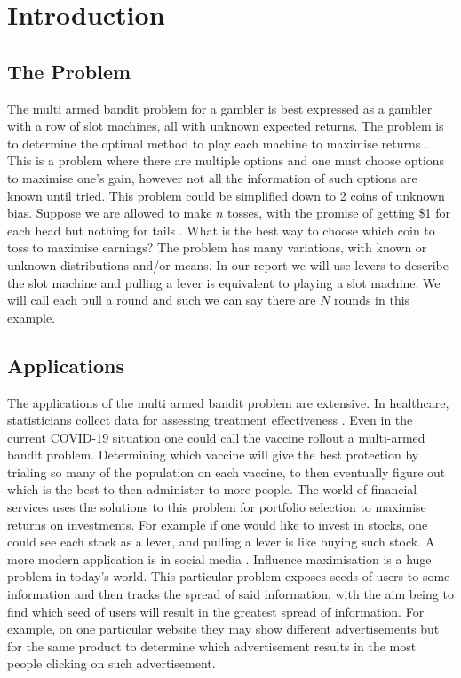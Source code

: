 \section{Introduction}\label{sec:introduction}

\subsection{The Problem}\label{subsec:the-problem}
The multi armed bandit problem for a gambler is best expressed as a gambler with a row of slot machines, all with unknown expected returns.
The problem is to determine the optimal method to play each machine to maximise returns \citep{vermorel}.
This is a problem where there are multiple options and one must choose options to maximise one's gain, however not all the information of such options are known until tried.
\newline
\newline
This problem could be simplified down to 2 coins of unknown bias.
Suppose we are allowed to make $n$ tosses, with the promise of getting \$1 for each head but nothing for tails \citep{robbins1952some}.
What is the best way to choose which coin to toss to maximise earnings?
The problem has many variations, with known or unknown distributions and/or means.
\newline
\newline
In our report we will use levers to describe the slot machine and pulling a lever is equivalent to playing a slot machine.
We will call each pull a round and such we can say there are $N$ rounds in this example.

\subsection{Applications}\label{subsec:applications}
The applications of the multi armed bandit problem are extensive.
In healthcare, statisticians collect data for assessing treatment effectiveness \citep{bouneffouf2019survey}.
Even in the current COVID-19 situation one could call the vaccine rollout a multi-armed bandit problem.
Determining which vaccine will give the best protection by trialing so many of the population on each vaccine, to then eventually figure out which is the best to then administer to more people.
The world of financial services uses the solutions to this problem for portfolio selection to maximise returns on investments.
For example if one would like to invest in stocks, one could see each stock as a lever, and pulling a lever is like buying such stock.
\newline
\newline
A more modern application is in social media \citep{chen2013combinatorial}.
Influence maximisation is a huge problem in today's world.
This particular problem exposes seeds of users to some information and then tracks the spread of said information, with the aim being to find which seed of users will result in the greatest spread of information.
For example, on one particular website they may show different advertisements but for the same product to determine which advertisement results in the most people clicking on such advertisement.

